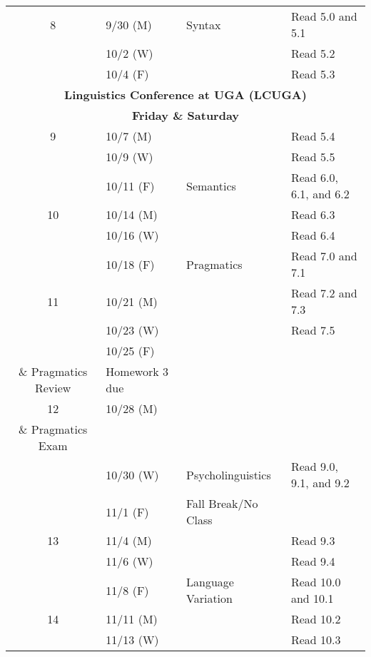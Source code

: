 \documentclass{article}
\makeatletter
\newcommand{\cellbreak}[2]{
    \begin{tabular}[t]{@{}l@{}}
      #1\\
      #2
    \end{tabular}}
\newcommand{\rowvspace}{\rule{0pt}{14pt}}
\makeatother
\begin{document}
\begin{longtable}{c l l l}
      8     & 9/30 (M)    & Syntax                          & Read 5.0 and 5.1\\
            & 10/2 (W)    &                                 & Read 5.2\\
            & 10/4 (F)    &                                 & Read 5.3\\
      \multicolumn{4}{c}{\textbf{Linguistics Conference at UGA (LCUGA)}\rowvspace}\\
      \multicolumn{4}{c}{\textbf{Friday \& Saturday}}\\
      9     & 10/7 (M)    & \rowvspace                      & Read 5.4\\
            & 10/9 (W)    &                                 & Read 5.5\\
            & 10/11 (F)   & Semantics                       & Read 6.0, 6.1, and 6.2\\
      10    & 10/14 (M)   &                                 & Read 6.3\\
            & 10/16 (W)   &                                 & Read 6.4\\
            & 10/18 (F)   & Pragmatics                      & Read 7.0 and 7.1\\
      11    & 10/21 (M)   &                                 & Read 7.2 and 7.3\\
            & 10/23 (W)   &                                 & Read 7.5\\
            & 10/25 (F)   & \cellbreak{Syntax, Semantics}
                                      {\& Pragmatics Review}& Homework 3 due\\
      12    & 10/28 (M)   & \cellbreak{Syntax, Semantics}
                                      {\& Pragmatics Exam}  & \\
            & 10/30 (W)   & Psycholinguistics               & Read 9.0, 9.1, and 9.2\\
            & 11/1 (F)    & Fall Break/No Class             & \\
      13    & 11/4 (M)    &                                 & Read 9.3\\
            & 11/6 (W)    &                                 & Read 9.4\\
            & 11/8 (F)    & Language Variation              & Read 10.0 and 10.1\\
      14    & 11/11 (M)   &                                 & Read 10.2\\
            & 11/13 (W)   &                                 & Read 10.3\\

\end{longtable}
\end{document}
